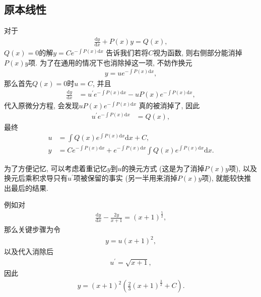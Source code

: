 \documentclass[UTF8,a4paper,11pt]{ctexart}
\begin{document}
    \subsection{原本线性}
      对于
      \[
      \begin{aligned}
        \frac{\mathrm{d}y}{\mathrm{d}x}+P\left(x\right)y=Q\left(x\right),
      \end{aligned}
      \]
      $Q\left(x\right)=0$的解$y=Ce^{-\int P\left(x\right)\mathrm{d}x}$
      告诉我们若将$C$视为函数, 则右侧部分能消掉$P\left(x\right)y$项.
      为了在通用的情况下也消除掉这一项, 不妨作换元
      \[
      \begin{aligned}
        y=ue^{-\int P\left(x\right)\mathrm{d}x},
      \end{aligned}
      \]
      那么首先$Q\left(x\right)=0$时$u=C$,
      并且
      \[
      \begin{aligned}
        \frac{\mathrm{d}y}{\mathrm{d}x}&=u^{\prime}e^{-\int P\left(x\right)\mathrm{d}x}-uP\left(x\right)e^{-\int P\left(x\right)\mathrm{d}x},
      \end{aligned}
      \]
      代入原微分方程, 会发现$uP\left(x\right)e^{-\int P\left(x\right)\mathrm{d}x}$
      真的被消掉了, 因此
      \[
      \begin{aligned}
        u^{\prime}e^{-\int P\left(x\right)\mathrm{d}x}&=Q\left(x\right),
      \end{aligned}
      \]
      最终
      \[
      \begin{aligned}
        u&=\int Q\left(x\right)e^{\int P\left(x\right)\mathrm{d}x}\mathrm{d}x+C,\\
        y&=Ce^{-\int P\left(x\right)\mathrm{d}x}+e^{-\int P\left(x\right)\mathrm{d}x}\int Q\left(x\right)e^{\int P\left(x\right)\mathrm{d}x}\mathrm{d}x.
      \end{aligned}
      \]

      为了方便记忆, 可以考虑着重记忆$y$到$u$的换元方式 (这是为了消掉$P\left(x\right)y$项),
      以及换元后乘积求导只有$u^{\prime}$项被保留的事实 (另一半用来消掉$P\left(x\right)y$项),
      就能较快推出最后的结果.

      例如对
      \[
      \begin{aligned}
        \frac{\mathrm{d}y}{\mathrm{d}x}-\frac{2y}{x+1}=\left(x+1\right)^{\frac{5}{2}},
      \end{aligned}
      \]
      那么关键步骤为令
      \[
      \begin{aligned}
        y=u\left(x+1\right)^{2},
      \end{aligned}
      \]
      以及代入消除后
      \[
      \begin{aligned}
        u^{\prime}=\sqrt{x+1},
      \end{aligned}
      \]
      因此
      \[
      \begin{aligned}
        y=\left(x+1\right)^{2}\left(\frac{2}{3}\left(x+1\right)^{\frac{3}{2}}+C\right).
      \end{aligned}
      \]
\end{document}
